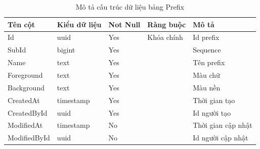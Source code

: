 \documentclass[../index.tex]{subfiles}
\begin{document}
    \begin{table}[H]
        \begin{tabular}{ |p{3cm}|p{2.5cm}|p{1.6cm}|p{2.2cm}|p{3cm}| }
            \hline
            Tên cột      & Kiểu dữ liệu             & Not Null & Ràng buộc  & Mô tả              \\
            \hline
            Id           & uuid                     & Yes      & Khóa chính & Id prefix          \\
            \hline
            SubId        & bigint                   & Yes      &            & Sequence           \\
            \hline
            Name         & text    & Yes      &            & Tên prefix         \\
            \hline
            Foreground   & text    & Yes      &            & Màu chữ            \\
            \hline
            Background   & text    & Yes      &            & Màu nền            \\
            \hline
            CreatedAt    & timestamp & Yes      &            & Thời gian tạo      \\
            \hline
            CreatedById  & uuid                     & Yes      &            & Id người tạo       \\
            \hline
            ModifiedAt   & timestamp & No       &            & Thời gian cập nhật \\
            \hline
            ModifiedById & uuid                     & No       &            & Id người cập nhật  \\
            \hline
        \end{tabular}
        \caption{Mô tả cấu trúc dữ liệu bảng Prefix}
    \end{table}
\end{document}
